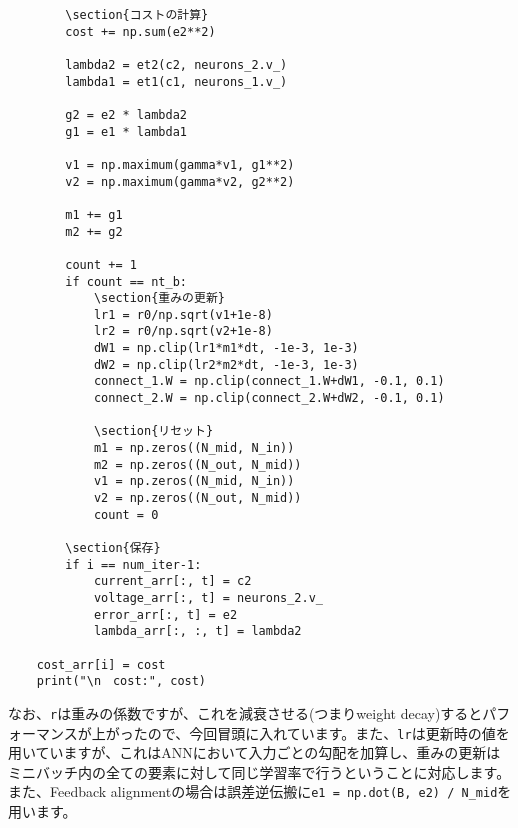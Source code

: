 \begin{verbatim}
        \section{コストの計算}
        cost += np.sum(e2**2)
        
        lambda2 = et2(c2, neurons_2.v_)
        lambda1 = et1(c1, neurons_1.v_)
        
        g2 = e2 * lambda2
        g1 = e1 * lambda1
        
        v1 = np.maximum(gamma*v1, g1**2)
        v2 = np.maximum(gamma*v2, g2**2)
        
        m1 += g1
        m2 += g2
    
        count += 1
        if count == nt_b:
            \section{重みの更新}
            lr1 = r0/np.sqrt(v1+1e-8)
            lr2 = r0/np.sqrt(v2+1e-8)
            dW1 = np.clip(lr1*m1*dt, -1e-3, 1e-3)
            dW2 = np.clip(lr2*m2*dt, -1e-3, 1e-3)
            connect_1.W = np.clip(connect_1.W+dW1, -0.1, 0.1)
            connect_2.W = np.clip(connect_2.W+dW2, -0.1, 0.1)
            
            \section{リセット}
            m1 = np.zeros((N_mid, N_in))
            m2 = np.zeros((N_out, N_mid))
            v1 = np.zeros((N_mid, N_in))
            v2 = np.zeros((N_out, N_mid))
            count = 0
            
        \section{保存}
        if i == num_iter-1:
            current_arr[:, t] = c2
            voltage_arr[:, t] = neurons_2.v_
            error_arr[:, t] = e2
            lambda_arr[:, :, t] = lambda2
    
    cost_arr[i] = cost
    print("\n　cost:", cost)
\end{verbatim}
なお、\texttt{r}は重みの係数ですが、これを減衰させる(つまりweight decay)するとパフォーマンスが上がったので、今回冒頭に入れています。また、\texttt{lr}は更新時の値を用いていますが、これはANNにおいて入力ごとの勾配を加算し、重みの更新はミニバッチ内の全ての要素に対して同じ学習率で行うということに対応します。また、Feedback alignmentの場合は誤差逆伝搬に\colorbox{shadecolor}{\texttt{e1 = np.dot(B, e2) / N\_mid}}を用います。
